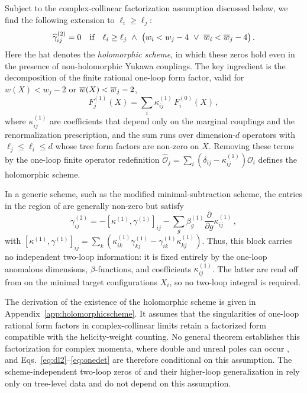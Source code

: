 Subject to the complex-collinear factorization assumption discussed below, we find the following
extension to $\ell_i \ge \ell_j$:
\begin{equation}
\label{eq:dl2}
 \widehat\gamma^{(2)}_{ij} = 0 \  \ \ \text{if} \  \ \ \ell_i \ge \ell_j \ \land \  \big(w_i < w_j - 4 \  \lor  \ \overline{w}_i < \overline{w}_j - 4 \big) \,.
\end{equation}
Here the hat denotes the \textit{holomorphic scheme}, in which these zeros hold even in the presence
of non-holomorphic Yukawa couplings.
The key ingredient is the decomposition of the finite rational one-loop form factor, valid for
$w(X)<w_j-2$ or $\overline{w}(X)<\overline{w}_j-2$,
\begin{equation}
\label{eq:contact}
F^{(1)}_j(X) = \sum_i \kappa^{(1)}_{ij}\, F^{(0)}_i(X) \,,
\end{equation}
where $\kappa^{(1)}_{ij}$ are coefficients that depend only on the marginal couplings and the
renormalization prescription, and the sum runs over dimension-$d$ operators with $\ell_j\le\ell_i\le
d$ whose tree form factors are non-zero on $X$.
Removing these terms by the one-loop finite operator redefinition
$\widehat{\mathcal O}_j=\sum_i(\delta_{ij}-\kappa^{(1)}_{ij})\mathcal O_i$ defines the holomorphic
scheme.

In a generic scheme, such as the modified minimal-subtraction scheme, the entries in the region of  are generally
non-zero but satisfy
\begin{equation}
\label{eq:onedet}
    \gamma^{(2)}_{ij} = -[\kappa^{(1)},\gamma^{(1)}]_{ij} - \sum_g\beta_g^{(1)}\frac{\partial}{\partial g} \kappa^{(1)}_{ij} \,,
\end{equation}
with $[\kappa^{(1)},\gamma^{(1)}]_{ij}=\sum_k(\kappa^{(1)}_{ik}\gamma^{(1)}_{kj}-\gamma^{(1)}_{ik}\kappa^{(1)}_{kj})$.
Thus, this block carries no independent two-loop information: it is fixed entirely by the one-loop
anomalous dimensions, $\beta$-functions, and coefficients $\kappa^{(1)}_{ij}$.
The latter are read off from  on the minimal target configurations $X_i$, so no
two-loop integral is required.

The derivation of the existence of the holomorphic scheme is given in
Appendix~\ref{app:holomorphicscheme}. It assumes that the singularities of one-loop rational form
factors in complex-collinear limits retain a factorized form compatible with the helicity-weight
counting.
No general theorem establishes this factorization for complex momenta, where double and unreal poles
can occur \cite{Bern:2005hs,Bern:2005ji,Bern:2005cq}, and Eqs.~\eqref{eq:dl2}--\eqref{eq:onedet} are
therefore conditional on this assumption.
The scheme-independent two-loop zeros of  and their higher-loop generalization in
 rely only on tree-level data and do not depend on this assumption.

